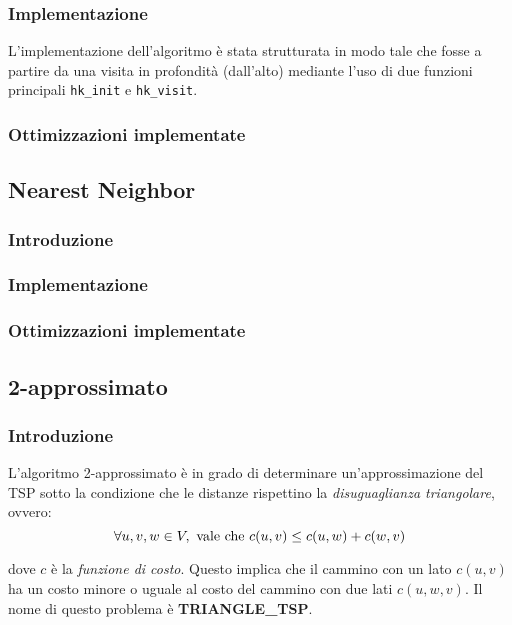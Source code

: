 \subsubsection{Implementazione}

L'implementazione dell'algoritmo è stata strutturata in modo tale che fosse a partire da una visita in profondità (dall'alto) mediante l'uso di due funzioni principali \texttt{hk\_init} e \texttt{hk\_visit}. 

\subsubsection{Ottimizzazioni implementate}

\subsection{Nearest Neighbor}

\subsubsection{Introduzione}

\subsubsection{Implementazione}

\subsubsection{Ottimizzazioni implementate}

\subsection{2-approssimato}

\subsubsection{Introduzione}

L'algoritmo 2-approssimato è in grado di determinare un'approssimazione del TSP sotto la condizione che le
distanze rispettino la \textit{disuguaglianza triangolare}, ovvero:
\begin{equation}
    \forall u, v, w \in V, \textnormal{ vale che } c(u, v) \le c(u, w) + c(w, v)
\end{equation}

dove $c$ è la \textit{funzione di costo}. Questo implica che il cammino con un lato $c(u, v)$ ha un costo
minore o uguale al costo del cammino con due lati $c(u, w, v)$. Il nome di questo problema è \textbf{TRIANGLE\_TSP}.

